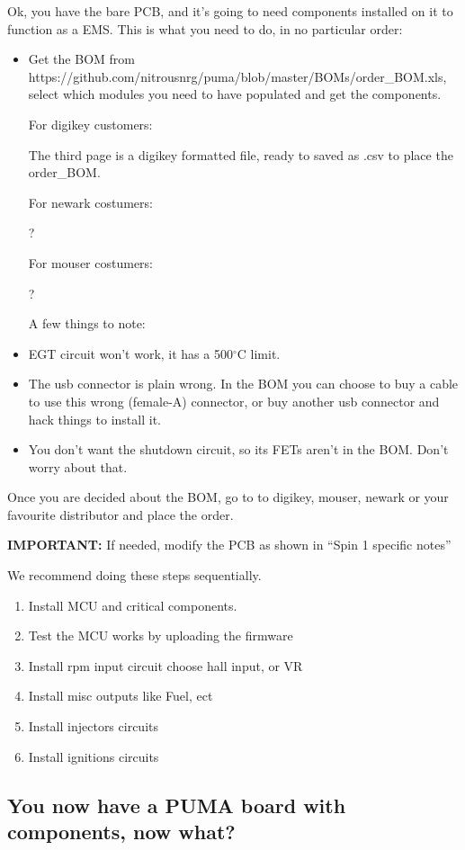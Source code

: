\documentclass[12pt,a4paper,titlepage]{article}
\begin{document}
Ok, you have the bare PCB, and it's going to need components installed on it to function as a EMS. This is what you need to do, in no particular order:
\begin{itemize}
\item Get the BOM from https://github.com/nitrousnrg/puma/blob/master/BOMs/order_BOM.xls, select which modules you need to have populated and get the components.

For digikey customers:

The third page is a digikey formatted file, ready to saved as .csv to place the order_BOM.

For newark costumers:

?

For mouser costumers:

?


A few things to note:
\item EGT circuit won't work, it has a 500$^{\circ}$C limit.
\item The usb connector is plain wrong. In the BOM you can choose to buy a cable to use this wrong (female-A) connector, or buy another usb connector and hack things to install it.
\item You don't want the shutdown circuit, so its FETs aren't in the BOM. Don't worry about that.
\end{itemize}

Once you are decided about the BOM, go to to digikey, mouser, newark or your favourite distributor and place the order.
\newline

\textbf{IMPORTANT:} If needed, modify the PCB as shown in ``Spin 1 specific notes''
\newline

We recommend doing these steps sequentially.

\begin{enumerate}
\item Install MCU and critical components.
\item Test the MCU works by uploading the firmware
\item Install rpm input circuit choose hall input, or VR
\item Install misc outputs like Fuel, ect
\item Install injectors circuits
\item Install ignitions circuits
\end{enumerate}


\subsection{You now have a PUMA board with components, now what?}
\end{document}
